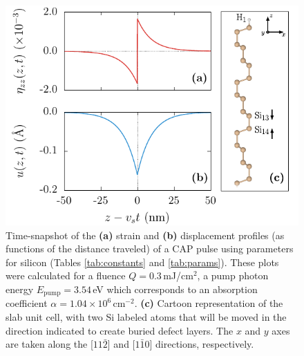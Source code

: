 \documentclass[aps,prb,10pt,showkeys,letterpaper,notitlepage,twocolumn]{revtex4-1}
\begin{document}
\begin{figure}[t]
\centering
\includegraphics[width=\linewidth]{fig01}
\caption{Time-snapshot of the \textbf{(a)} strain and \textbf{(b)} displacement
profiles (as functions of the distance traveled) of a CAP pulse using parameters
for silicon (Tables \ref{tab:constants} and \ref{tab:params}). These plots were
calculated for a fluence $Q = 0.3$\,mJ/cm$^{2}$, a pump photon energy
$E_{\mathrm{pump}} = 3.54$\,eV which corresponds to an absorption coefficient
$\alpha = 1.04\times10^{6}$\,cm$^{-2}$. \textbf{(c)} Cartoon representation of
the slab unit cell, with two Si labeled atoms that will be moved in the
direction indicated to create buried defect layers. The $x$ and $y$ axes are
taken along the [$11\bar{2}$] and [$1\bar{1}0$] directions, respectively.}
\label{fig:pulse}
\end{figure}
\end{document}
